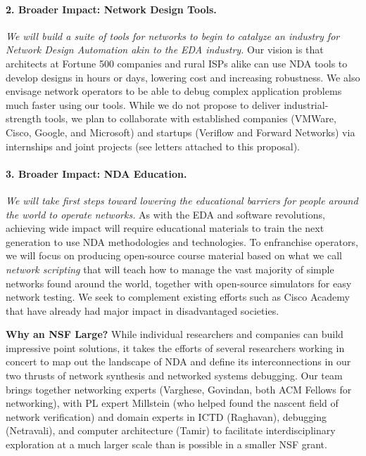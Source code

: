 \paragraph*{2. Broader Impact: Network Design Tools.}{\em We will build a suite of tools for networks to begin to catalyze an industry for Network Design Automation akin to the EDA industry.}
%
 Our vision is that architects at Fortune 500 companies and rural ISPs alike can use NDA tools to develop designs in hours or days, lowering cost and increasing robustness. We also envisage network operators to be able to debug complex application problems much faster using our tools.  While we do not propose to deliver industrial-strength tools, we plan to collaborate with established companies (VMWare, Cisco, Google, and Microsoft) and startups (Veriflow and Forward Networks) via internships and joint projects (see letters  attached to this proposal).

\paragraph*{3. Broader Impact: NDA Education.} {\em We will take first steps toward lowering the educational barriers for people around the world to operate networks.}
%
As with the EDA and software revolutions, achieving wide impact will require educational materials to train the next generation to use NDA methodologies and technologies. To enfranchise operators, we will focus on producing open-source course material based on what we call {\em network scripting} that will teach how to manage the vast majority of simple networks found around the world, together with open-source simulators for easy network testing. We seek to complement existing efforts such as Cisco Academy~\cite{ciscoacademy} that have already had major impact in disadvantaged societies.

{\bf Why an NSF Large?}  While individual researchers and companies can build impressive point solutions, it takes the efforts of several researchers working in concert to map out the landscape of NDA and define its interconnections in our two thrusts of network synthesis and
networked systems debugging.  Our team brings together networking experts (Varghese, Govindan, both ACM Fellows for networking), with PL expert Millstein (who helped found the nascent field of network verification) and domain experts in ICTD (Raghavan), debugging (Netravali), and computer architecture (Tamir) to facilitate interdisciplinary exploration at a much larger scale than is possible in a smaller NSF grant.

